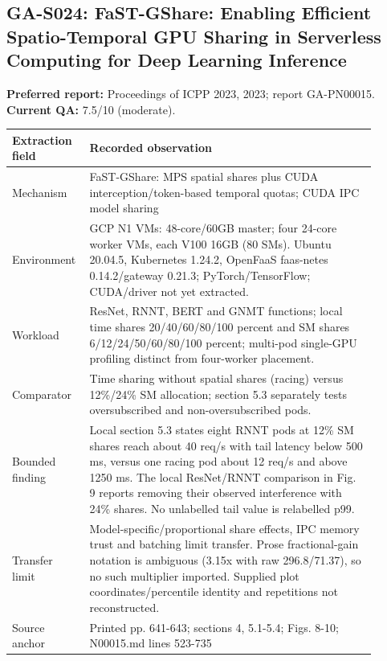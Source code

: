 \subsection{GA-S024: FaST-GShare: Enabling Efficient Spatio-Temporal GPU Sharing in Serverless Computing for Deep Learning Inference}
\textbf{Preferred report:} Proceedings of ICPP 2023, 2023; report GA-PN00015. \textbf{Current QA:} 7.5/10 (moderate).
\begin{longtable}{P{0.15\linewidth}P{0.75\linewidth}}
\toprule Extraction field & Recorded observation\\\midrule\endhead
Mechanism & FaST-GShare: MPS spatial shares plus CUDA interception/token-based temporal quotas; CUDA IPC model sharing\\
Environment & GCP N1 VMs: 48-core/60GB master; four 24-core worker VMs, each V100 16GB (80 SMs). Ubuntu 20.04.5, Kubernetes 1.24.2, OpenFaaS faas-netes 0.14.2/gateway 0.21.3; PyTorch/TensorFlow; CUDA/driver not yet extracted.\\
Workload & ResNet, RNNT, BERT and GNMT functions; local time shares 20/40/60/80/100 percent and SM shares 6/12/24/50/60/80/100 percent; multi-pod single-GPU profiling distinct from four-worker placement.\\
Comparator & Time sharing without spatial shares (racing) versus 12\%/24\% SM allocation; section 5.3 separately tests oversubscribed and non-oversubscribed pods.\\
Bounded finding & Local section 5.3 states eight RNNT pods at 12\% SM shares reach about 40 req/s with tail latency below 500 ms, versus one racing pod about 12 req/s and above 1250 ms. The local ResNet/RNNT comparison in Fig. 9 reports removing their observed interference with 24\% shares. No unlabelled tail value is relabelled p99.\\
Transfer limit & Model-specific/proportional share effects, IPC memory trust and batching limit transfer. Prose fractional-gain notation is ambiguous (3.15x with raw 296.8/71.37), so no such multiplier imported. Supplied plot coordinates/percentile identity and repetitions not reconstructed.\\
Source anchor & Printed pp. 641-643; sections 4, 5.1-5.4; Figs. 8-10; N00015.md lines 523-735\\
\bottomrule\end{longtable}
